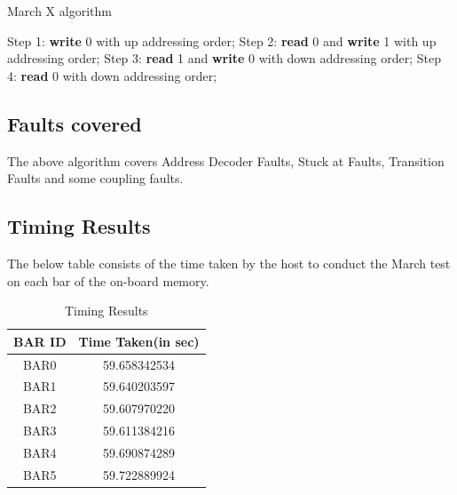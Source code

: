 \begin{algorithm}
\caption{March X algorithm}\label{March X}
\begin{algorithmic}[1]
\State Step 1: \textbf{write} 0 with up addressing order;
\State Step 2: \textbf{read} 0 and \textbf{write} 1 with up addressing order;
\State Step 3: \textbf{read} 1 and \textbf{write} 0 with down addressing order;
\State Step 4: \textbf{read} 0 with down addressing order;
\end{algorithmic}
\end{algorithm}

\subsection{Faults covered}
The above algorithm covers Address Decoder Faults, Stuck at Faults, Transition Faults and some coupling faults.

\subsection{Timing Results}

The below table consists of the time taken by the host to conduct the March test on each bar of the on-board memory.

\begin{table}[H]
\centering
\begin{tabular}{c | c}
\hline
BAR ID & Time Taken(in sec) \\
\hline
BAR0 & 59.658342534 \\
BAR1 & 59.640203597 \\
BAR2 & 59.607970220 \\
BAR3 & 59.611384216 \\
BAR4 & 59.690874289 \\
BAR5 & 59.722889924
\end{tabular}
\caption{Timing Results}
\end{table}
